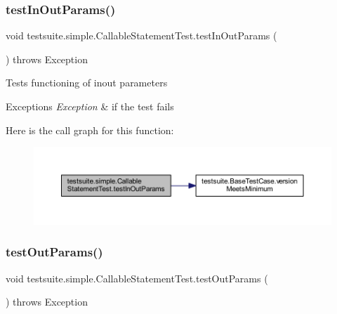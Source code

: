 \subsubsection{\texorpdfstring{test\+In\+Out\+Params()}{testInOutParams()}}
{\footnotesize\ttfamily void testsuite.\+simple.\+Callable\+Statement\+Test.\+test\+In\+Out\+Params (\begin{DoxyParamCaption}{ }\end{DoxyParamCaption}) throws Exception}

Tests functioning of inout parameters


\begin{DoxyExceptions}{Exceptions}
{\em Exception} & if the test fails \\
\hline
\end{DoxyExceptions}
Here is the call graph for this function\+:
\nopagebreak
\begin{figure}[H]
\begin{center}
\leavevmode
\includegraphics[width=350pt]{classtestsuite_1_1simple_1_1_callable_statement_test_aff9447e7125f78c20b0eab4c5646b013_cgraph}
\end{center}
\end{figure}
\mbox{\label{classtestsuite_1_1simple_1_1_callable_statement_test_a1b410c096cba5e99995e4e3fb465a1b7}} 
\subsubsection{\texorpdfstring{test\+Out\+Params()}{testOutParams()}}
{\footnotesize\ttfamily void testsuite.\+simple.\+Callable\+Statement\+Test.\+test\+Out\+Params (\begin{DoxyParamCaption}{ }\end{DoxyParamCaption}) throws Exception}

